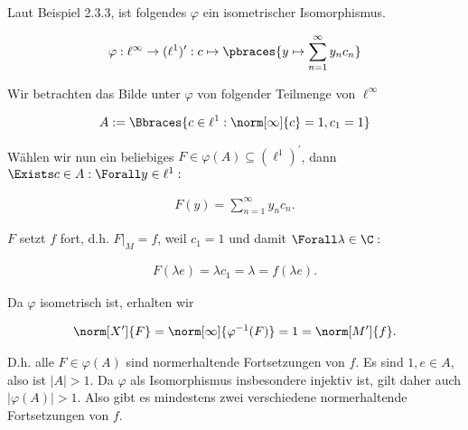 \begin{solution}
\begin{enumerate}
\end{enumerate}

Laut Beispiel 2.3.3, ist folgendes $\varphi$ ein isometrischer Isomorphismus.

\begin{align*}
  \varphi:
  \ell^\infty \to (\ell^1)^\prime:
  c \mapsto
  \pbraces
  {
    y \mapsto
    \sum_{n = 1}^\infty y_n c_n
  }
\end{align*}

Wir betrachten das Bilde unter $\varphi$ von folgender Teilmenge von $\ell^\infty$

\begin{align*}
  A :=
  \Bbraces
  {
    c \in \ell^1:
    \norm[\infty]{c} = 1,  c_1 = 1
  }
\end{align*}

Wählen wir nun ein beliebiges $F \in \varphi(A) \subseteq (\ell^1)^\prime$, dann $\Exists c \in A: \Forall y \in \ell^1:$

\begin{align*}
  F(y)
  =
  \sum_{n=1}^\infty y_n c_n.
\end{align*}

$F$ setzt $f$ fort, d.h. $F|_M = f$, weil $c_1 = 1$ und damit $\Forall \lambda \in \C:$

\begin{align*}
  F(\lambda e)
  =
  \lambda c_1
  =
  \lambda
  =
  f(\lambda e).
\end{align*}

Da $\varphi$ isometrisch ist, erhalten wir

\begin{align*}
  \norm[X^\prime]{F}
  =
  \norm[\infty]{\varphi^{-1}(F)}
  =
  1
  =
  \norm[M^\prime]{f}.
\end{align*}

D.h. alle $F \in \varphi(A)$ sind normerhaltende Fortsetzungen von $f$.
Es sind $1, e \in A$, also ist $|A| > 1$.
Da $\varphi$ als Isomorphismus insbesondere injektiv ist, gilt daher auch $|\varphi(A)| > 1$.
Also gibt es mindestens zwei verschiedene normerhaltende Fortsetzungen von $f$.

\end{solution}
